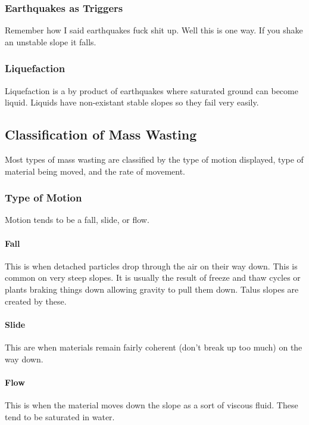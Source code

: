 \documentclass{article}
\begin{document}
\subsubsection{Earthquakes as Triggers} %
\label{ssub:earthquakes_as_triggers}
Remember how I said earthquakes fuck shit up. Well this is one way. If you shake an unstable slope it falls.

\subsubsection{Liquefaction} %
\label{ssub:liquefaction}
Liquefaction is a by product of earthquakes where saturated ground can become liquid. Liquids have non-existant stable slopes so they fail very easily.


\subsection{Classification of Mass Wasting} %
\label{sub:classification_of_mass_wasting}
Most types of mass wasting are classified by the type of motion displayed, type of material being moved, and the rate of movement.

\subsubsection{Type of Motion} %
\label{ssub:type_of_motion}
Motion tends to be a fall, slide, or flow.

\paragraph{Fall} %
\label{par:fall}
This is when detached particles drop through the air on their way down. This is common on very steep slopes. It is usually the result of freeze and thaw cycles or plants braking things down allowing gravity to pull them down. Talus slopes are created by these.
\paragraph{Slide} %
\label{par:slide}
This are when materials remain fairly coherent (don't break up too much) on the way down.
\paragraph{Flow} %
\label{par:flow}
This is when the material moves down the slope as a sort of viscous fluid. These tend to be saturated in water.
\end{document}
